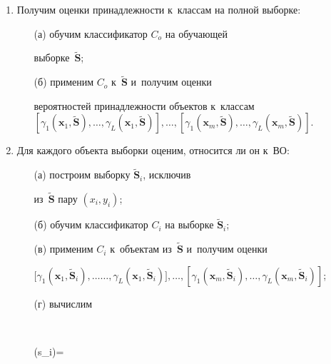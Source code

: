 \begin{enumerate}[1.]

\item Получим оценки принадлежности к~классам на полной выборке: 

\begin{itemize}

\item [(а)] обучим классификатор $C_o$ на обучающей 

выборке~$\tilde{\mathbf{S}}$; 

\item [(б)] применим $C_o$ к~$\tilde{\mathbf{S}}$ и~получим оценки 

вероятностей принадлежности объектов к~классам $[\gamma_1(\mathbf{x}_1, 

\tilde{\mathbf{S}}),\ldots , \gamma_L(\mathbf{x}_1,\tilde{\mathbf{S}})], \ldots , 

[\gamma_1(\mathbf{x}_m, \tilde{\mathbf{S}}), \ldots , 

\gamma_L(\mathbf{x}_m, \tilde{\mathbf{S}})]$.

\end{itemize}

\item Для каждого объекта выборки оценим, относится ли он к~ВО:

\begin{itemize}

\item [(а)] построим выборку $\tilde{\mathbf{S}}_i$, исключив 

из~$\tilde{\mathbf{S}}$ пару $(x_i,y_i)$;

\item [(б)] обучим классификатор $C_i$ на выборке $\tilde{\mathbf{S}}_i$;

\item [(в)]  применим $C_i$ к~объектам из~$\tilde{\mathbf{S}}$ и~получим оценки 

$[\gamma_1(\mathbf{x}_1, \tilde{\mathbf{S}}_i),\ldots$\linebreak $\ldots , 

\gamma_L(\mathbf{x}_1,\tilde{\mathbf{S}}_i)], \ldots , 

[\gamma_1(\mathbf{x}_m, \tilde{\mathbf{S}}_i), \ldots , 

\gamma_L(\mathbf{x}_m, \tilde{\mathbf{S}}_i)]$;

\item [(г)] вычислим

$$

\delta\left(s_i\right)=\fr{\sum\nolimits^L_{l=1} \sum\nolimits^m_{j=1} [\gamma_l 

}
\end{itemize}
\end{enumerate}
